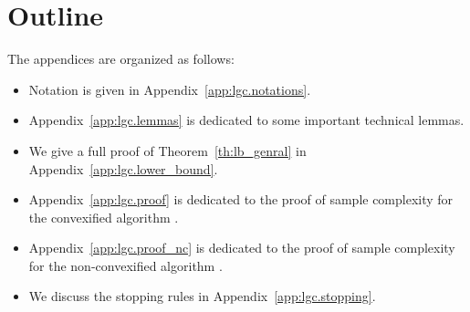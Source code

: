\section{Outline}\label{app:lgc.outline}

The appendices are organized as follows:
\begin{itemize}[label=$\square$]
    \item Notation is given in Appendix~\ref{app:lgc.notations}. 
    \item Appendix~\ref{app:lgc.lemmas} is dedicated to some important technical lemmas.
    \item We give a full proof of Theorem~\ref{th:lb_genral} in Appendix~\ref{app:lgc.lower_bound}.
    \item Appendix~\ref{app:lgc.proof} is dedicated to the proof of sample complexity for the convexified algorithm \LGC.
    \item Appendix~\ref{app:lgc.proof_nc} is dedicated to the proof of sample complexity for the non-convexified algorithm \LG.
    \item We discuss the stopping rules in Appendix~\ref{app:lgc.stopping}.
\end{itemize}
